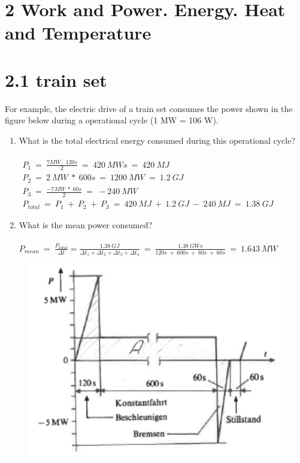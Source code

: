 \documentclass[10pt,ngerman]{scrartcl}
\begin{document}
\newpage
\section{2 Work and Power. Energy. Heat and Temperature}
\section{2.1 train set}
For example, the electric drive of a train set consumes the power shown in the figure below during a operational cycle (1 MW = 106 W).

\begin{enumerate}
	\item What is the total electrical energy consumed during this operational cycle?\\\\
	$
	\begin{array}{l}
		P_{1} \ =\ \frac{7MW\cdot \ 120s}{2} \ =\ 420\ MWs\ =\ 420\ MJ\\
		P_{2} \ =\ 2\ MW\ *\ 600s\ =\ 1200\ MW\ =\ 1.2\ GJ\\
		P_{3} \ =\ \frac{-7MW\ *\ 60s}{2} \ =\ -240\ MW\\
		P_{total} \ =\ P_{1} \ +\ P_{2} \ +\ P_{3} \ =\ 420\ MJ\ +\ 1.2\ GJ\ -\ 240\ MJ\ =\ 1.38\ GJ
		\end{array}
	$
	\item What is the mean power consumed?\\\\
	$
        P_{mean} \ =\ \frac{P_{total}}{\Delta t} = \frac{1.38\ GJ}{\Delta t_{1} +\Delta t_{2} +\Delta t_{3} +\Delta t_{4}} \ =\ \frac{1.38\ GWs}{120s\ +\ 600s\ +\ 60s\ +\ 60s} \ =\ 1.643\ MW
    $
\end{enumerate}

\begin{figure}[H]
	\centering
	\includegraphics[scale=0.5]{group_work_1.png}
\end{figure}
\end{document}
